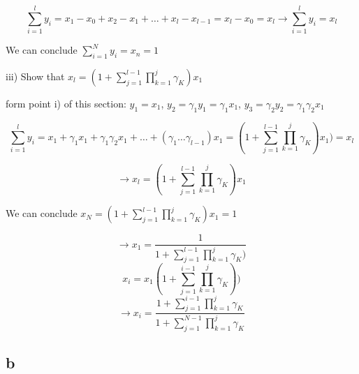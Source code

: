 \[ \sum\limits_{i=1}^{l} y_i = x_1-x_0+x_2-x_1+\dots+x_l-x_{l-1} = x_l -x_0 = x_l \rightarrow \boxed{\sum\limits_{i=1}^{l} y_i = x_l}  \]

We can conclude $\boxed{\sum\limits_{i=1}^{N} y_i = x_n = 1}$

iii) Show that $x_l = (1+ \sum\limits_{j=1}^{l-1} \prod\limits_{k=1}^{j} \gamma_K)x_1$

form point i) of this section: $y_1 = x_1$, $y_2 = \gamma_1y_1 = \gamma_1x_1$, $y_3=\gamma_2y_2 = \gamma_1\gamma_2x_1$

\[ \sum\limits_{i=1}^{l} y_i = x_1 + \gamma_1x_1 + \gamma_1\gamma_2x_1+\dots+(\gamma_1\dots\gamma_{l-1})x_1 = (1+\sum\limits_{j=1}^{l-1}\prod\limits_{k=1}^{j} \gamma_K) x_1 ) = x_l \]

\[ \rightarrow \boxed{x_l = (1+ \sum\limits_{j=1}^{l-1}\prod\limits_{k=1}^{j} \gamma_K)x_1  }  \]

We can conclude $x_N = (1+ \sum\limits_{j=1}^{l-1}\prod\limits_{k=1}^{j} \gamma_K)x_1 = 1$

\[ \rightarrow  \boxed{ x_1 = \frac{1}{ 1 + \sum\limits_{j=1}^{l-1}\prod\limits_{k=1}^{j} \gamma_K)} } \]
\[ x_i = x_1 (1+\sum\limits_{j=1}^{i-1}\prod\limits_{k=1}^{j} \gamma_K) ) \]
\[ \rightarrow  \boxed{ x_i = \frac{1+\sum\limits_{j=1}^{i-1}\prod\limits_{k=1}^{j} \gamma_K}{1+\sum\limits_{j=1}^{N-1}\prod\limits_{k=1}^{j} \gamma_K} }\]

\subsection{b}

